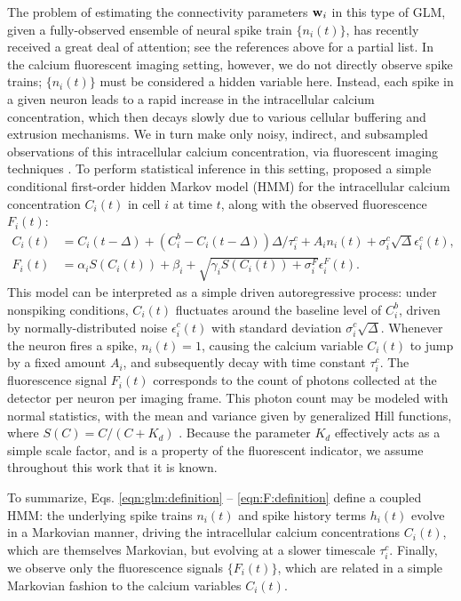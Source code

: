 The problem of estimating the connectivity parameters $\mathbf{w}_i$ in this type of GLM, given a fully-observed ensemble of neural spike train $\{n_i(t)\}$, has recently received a great deal of attention; see the references above for a partial list. In the calcium fluorescent imaging setting, however, we do not directly observe spike trains; $\{n_i(t)\}$ must be considered a hidden variable here. Instead, each spike in a given neuron leads to a rapid increase in the intracellular calcium concentration, which then decays slowly due to various cellular buffering and extrusion mechanisms. We in turn make only noisy, indirect, and subsampled observations of this intracellular calcium concentration, via fluorescent imaging techniques \cite{ImagingManual}. To perform statistical inference in this setting, \cite{Vogelstein2009} proposed a simple conditional first-order hidden Markov model (HMM) for the intracellular calcium concentration $C_i(t)$ in cell $i$ at time $t$, along with the observed fluorescence $F_i(t)$: \begin{align} \label{eqn:ca:definition} C_i(t) &= C_i(t-\Delta) + (C_i^b-C_i(t-\Delta)) \Delta/\tau^c_i + A_i n_i(t)+\sigma^c_i \sqrt{\Delta} \epsilon^c_i(t), \\ F_i(t) &= \alpha_i S(C_i(t)) + \beta_i + \sqrt{\gamma_i S(C_i(t)) + \sigma^F_i} \epsilon^F_i(t). \label{eqn:F:definition} \end{align} This model can be interpreted as a simple driven autoregressive process: under nonspiking conditions, $C_i(t)$ fluctuates around the baseline level of $C_i^b$, driven by normally-distributed noise $\epsilon^c_i(t)$ with standard deviation $\sigma^c_i \sqrt{\Delta}$. Whenever the neuron fires a spike, $n_i(t)=1$, causing the calcium variable $C_i(t)$ to jump by a fixed amount $A_i$, and subsequently decay with time constant $\tau^c_i$. The fluorescence signal $F_i(t)$ corresponds to the count of photons collected at the detector per neuron per imaging frame. This photon count may be modeled with normal statistics, with the mean and variance given by generalized Hill functions, where $S(C)=C/(C+K_d)$ \cite{Yasuda2004}. Because the parameter $K_d$ effectively acts as a simple scale factor, and is a property of the fluorescent indicator, we assume throughout this work that it is known.

To summarize, Eqs. \ref{eqn:glm:definition} -- \ref{eqn:F:definition} define a coupled HMM: the underlying spike trains $n_i(t)$ and spike history terms $h_i(t)$ evolve in a Markovian manner, driving the intracellular calcium concentrations $C_i(t)$, which are themselves Markovian, but evolving at a slower timescale $\tau_i^c$. Finally, we observe only the fluorescence signals $\{F_i(t)\}$, which are related in a simple Markovian fashion to the calcium variables $C_i(t)$.


